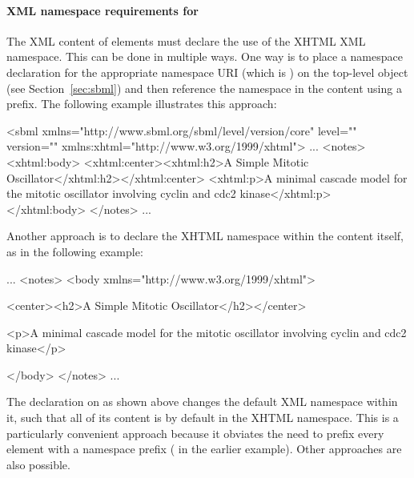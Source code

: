 

\paragraph{XML namespace requirements for }

The XML content of  elements must declare the use of
the XHTML XML namespace.  This can be done in multiple ways.  One
way is to place a namespace declaration for the appropriate
namespace URI (which is ) on the
top-level \Sbml object (see Section~\ref{sec:sbml}) and then
reference the namespace in the  content using a
prefix.  The following example illustrates this approach:

\begin{example}
<sbml xmlns="http://www.sbml.org/sbml/level\sbmllevel/version\sbmlversionnum/core" level="\sbmllevel" version="\sbmlversionnum"
      xmlns:xhtml="http://www.w3.org/1999/xhtml">
  ...
  <notes>
    <xhtml:body>
      <xhtml:center><xhtml:h2>A Simple Mitotic Oscillator</xhtml:h2></xhtml:center>
      <xhtml:p>A minimal cascade model for the mitotic oscillator
      involving cyclin and cdc2 kinase</xhtml:p>
    </xhtml:body>
  </notes>
  ...
\end{example}

Another approach is to declare the XHTML namespace within the
 content itself, as in the following example:

\begin{example}
...
<notes>
  <body xmlns="http://www.w3.org/1999/xhtml">

    <center><h2>A Simple Mitotic Oscillator</h2></center>

    <p>A minimal cascade model for the mitotic oscillator
    involving cyclin and cdc2 kinase</p>

  </body>
</notes>
...
\end{example}

The  declaration on
 as shown above changes the default XML namespace
within it, such that all of its content is by default in the XHTML
namespace.  This is a particularly convenient approach because it
obviates the need to prefix every element with a namespace prefix
(\ie {} in the earlier example).  Other
approaches are also possible.


